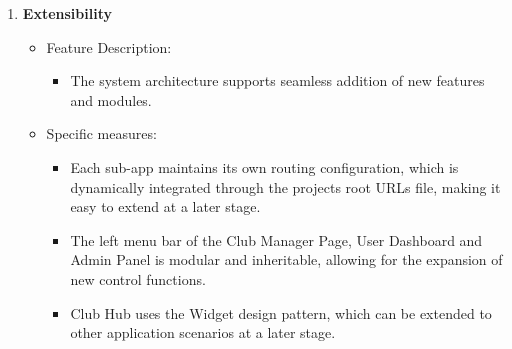 \begin{enumerate}
\begin{itemize}
        \begin{itemize}
        \item
          The platform is intuitive, easy to learn and use, with a clear
          interface aligned with user expectations.
        \end{itemize}
      \item
        Specific measures:
    
        \begin{itemize}
        \item
          Cross-application style harmonization through global CSS variables
          and component libraries (e.g. Bootstrap)
        \item
          Three-tier information structure (Navbar → Left menu → Card
          Controls) for Club Manager Page, User Dashboard and Admin Panel to
          reduce the cognitive load on users.
        \item
          Implemented search function in most of the forms to reduce the
          user\textquotesingle s difficulty. For example:
    
          \begin{itemize}
          \item
            Search box at the top of the "Clubs" page
          \end{itemize}
        \end{itemize}
      \end{itemize}
    \item
      \textbf{Extensibility}
    
      \begin{itemize}
      \item
        Feature Description:
    
        \begin{itemize}
        \item
          The system architecture supports seamless addition of new features
          and modules.
        \end{itemize}
      \item
        Specific measures:
    
        \begin{itemize}
        \item
          Each sub-app maintains its own routing configuration, which is
          dynamically integrated through the project\textquotesingle s root
          URLs file, making it easy to extend at a later stage.
        \item
          The left menu bar of the Club Manager Page, User Dashboard and
          Admin Panel is modular and inheritable, allowing for the expansion
          of new control functions.
        \item
          Club Hub uses the Widget design pattern, which can be extended to
          other application scenarios at a later stage.
        \end{itemize}
      \end{itemize}
    \end{enumerate}
